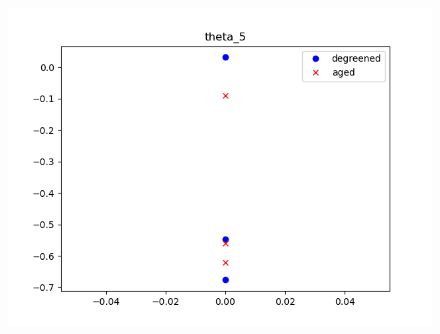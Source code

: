 \begin{figure}[H]
\begin{minipage}{0.33\textwidth}
                \includegraphics[width = \textwidth]{./figs/figs_new_mdl/theta_5.png}
        \end{minipage}
\end{figure}

